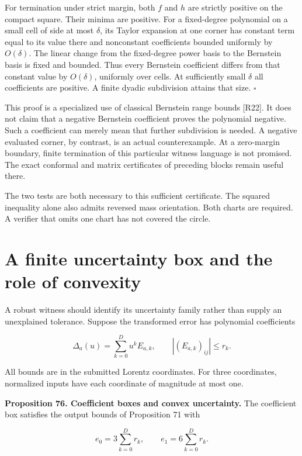 For termination under strict margin, both \(f\) and \(h\) are strictly
positive on the compact square. Their minima are positive. For a
fixed-degree polynomial on a small cell of side at most \(\delta\), its
Taylor expansion at one corner has constant term equal to its value
there and nonconstant coefficients bounded uniformly by \(O(\delta)\).
The linear change from the fixed-degree power basis to the Bernstein
basis is fixed and bounded. Thus every Bernstein coefficient differs
from that constant value by \(O(\delta)\), uniformly over cells. At
sufficiently small \(\delta\) all coefficients are positive. A finite
dyadic subdivision attains that size. \(\square\)

This proof is a specialized use of classical Bernstein range bounds
{[}R22{]}. It does not claim that a negative Bernstein coefficient
proves the polynomial negative. Such a coefficient can merely mean that
further subdivision is needed. A negative evaluated corner, by contrast,
is an actual counterexample. At a zero-margin boundary, finite
termination of this particular witness language is not promised. The
exact conformal and matrix certificates of preceding blocks remain
useful there.

The two tests are both necessary to this sufficient certificate. The
squared inequality alone also admits reversed mass orientation. Both
charts are required. A verifier that omits one chart has not covered the
circle.

\section{A finite uncertainty box and the role of convexity}\label{LSM:a-finite-uncertainty-box-and-the-role-of-convexity}

A robust witness should identify its uncertainty family rather than
supply an unexplained tolerance. Suppose the transformed error has
polynomial coefficients

\[
\Delta_a(u)=\sum_{k=0}^{D}u^kE_{a,k},\qquad
|(E_{a,k})_{ij}|\leq r_k.
\]

All bounds are in the submitted Lorentz coordinates. For three
coordinates, normalized inputs have each coordinate of magnitude at most
one.

\textbf{Proposition 76. Coefficient boxes and convex uncertainty.} The
coefficient box satisfies the output bounds of Proposition 71 with

\[
\boxed{e_0=3\sum_{k=0}^{D}r_k,\qquad e_1=6\sum_{k=0}^{D}r_k.}
\]

